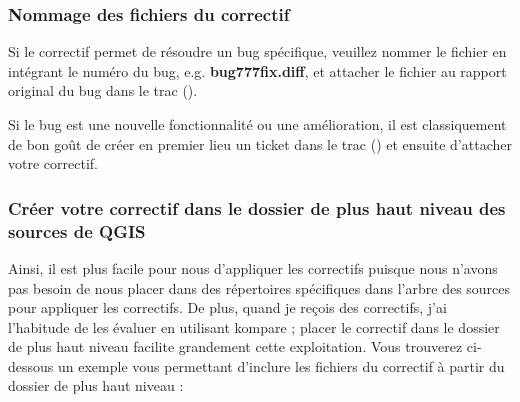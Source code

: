\subsubsection{Nommage des fichiers du correctif}
Si le correctif permet de r\'esoudre un bug sp\'ecifique, veuillez nommer le fichier en int\'egrant le num\'ero du bug, e.g. 
\textbf{bug777fix.diff}, et attacher le fichier au rapport original du bug dans le trac ().

Si le bug est une nouvelle fonctionnalit\'e ou une am\'elioration, il est classiquement de bon go\^ut de cr\'eer en premier lieu un ticket dans le trac () et ensuite d'attacher votre correctif.

\subsubsection{Cr\'eer votre correctif dans le dossier de plus haut niveau des sources de QGIS}
Ainsi, il est plus facile pour nous d'appliquer les correctifs puisque nous n'avons pas besoin de nous placer dans des r\'epertoires sp\'ecifiques dans l'arbre des sources pour appliquer les correctifs. De plus, quand je re\c{c}ois des correctifs, j'ai l'habitude de les \'evaluer en utilisant kompare ; placer le correctif dans le dossier de plus haut niveau facilite grandement cette exploitation. Vous trouverez ci-dessous un exemple vous permettant d'inclure les fichiers du correctif \`a partir du dossier de plus haut niveau :

